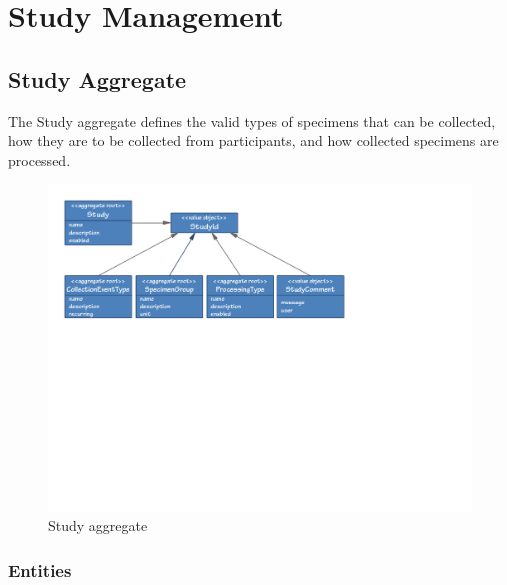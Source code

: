 \chapter{Study Management}

\section{Study Aggregate}

 The Study aggregate defines the valid types of specimens that can be
 collected, how they are to be collected from participants, and how collected
 specimens are processed.

\begin{figure}[h]
  \includegraphics[trim={9mm 124mm 80mm 8mm}, clip,
    width=1\textwidth]{images/study-aggregate}
  \caption{Study aggregate}
  \label{fig:study-aggregate}
\end{figure}

\subsection{Entities}

